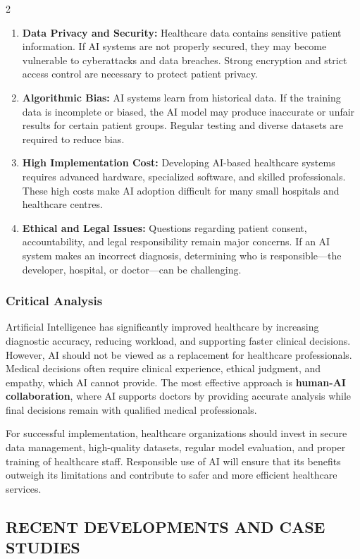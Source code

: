 \begin{multicols}{2}
\begin{enumerate}[label=\alph*)]
\item \textbf{Data Privacy and Security:} Healthcare data contains sensitive patient information. If AI systems are not properly secured, they may become vulnerable to cyberattacks and data breaches. Strong encryption and strict access control are necessary to protect patient privacy.
\item \textbf{Algorithmic Bias:} AI systems learn from historical data. If the training data is incomplete or biased, the AI model may produce inaccurate or unfair results for certain patient groups. Regular testing and diverse datasets are required to reduce bias.
\item \textbf{High Implementation Cost:} Developing AI-based healthcare systems requires advanced hardware, specialized software, and skilled professionals. These high costs make AI adoption difficult for many small hospitals and healthcare centres.
\item \textbf{Ethical and Legal Issues:} Questions regarding patient consent, accountability, and legal responsibility remain major concerns. If an AI system makes an incorrect diagnosis, determining who is responsible—the developer, hospital, or doctor—can be challenging.
\end{enumerate}

\subsubsection*{Critical Analysis}
Artificial Intelligence has significantly improved healthcare by increasing diagnostic accuracy, reducing workload, and supporting faster clinical decisions. However, AI should not be viewed as a replacement for healthcare professionals. Medical decisions often require clinical experience, ethical judgment, and empathy, which AI cannot provide. The most effective approach is \textbf{human-AI collaboration}, where AI supports doctors by providing accurate analysis while final decisions remain with qualified medical professionals.

\noindent
For successful implementation, healthcare organizations should invest in secure data management, high-quality datasets, regular model evaluation, and proper training of healthcare staff. Responsible use of AI will ensure that its benefits outweigh its limitations and contribute to safer and more efficient healthcare services.

\subsection*{\centering\uppercase{Recent Developments and Case Studies}}

\end{multicols}
